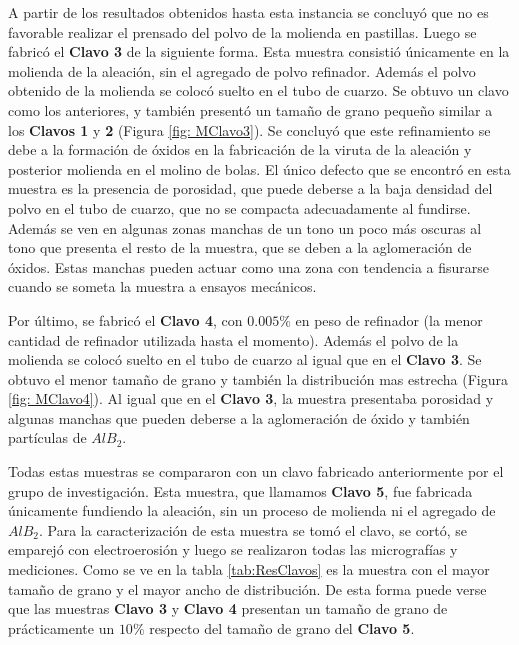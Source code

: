 \documentclass[a4paper,12pt,fleqn,twoside,openany]{book}
\begin{document}
A partir de los resultados obtenidos hasta esta instancia se concluyó que no es favorable realizar el prensado del polvo de la molienda en pastillas. 
Luego se fabricó el \textbf{Clavo 3} de la siguiente forma. Esta muestra consistió únicamente en la molienda de la aleación, sin el agregado de polvo refinador. Además el polvo obtenido de la molienda se colocó suelto en el tubo de cuarzo. Se obtuvo un clavo como los anteriores, y también presentó un tamaño de grano pequeño similar a los \textbf{Clavos 1} y \textbf{2} (Figura \ref{fig: MClavo3}). Se concluyó que este refinamiento se debe a la formación de óxidos en la fabricación de la viruta de la aleación y posterior molienda en el molino de bolas. El único defecto que se encontró en esta muestra es la presencia de porosidad, que puede deberse a la baja densidad del polvo en el tubo de cuarzo, que no se compacta adecuadamente al fundirse. Además se ven en algunas zonas manchas de un tono un poco más oscuras al tono que presenta el resto de la muestra, que se deben a la aglomeración de óxidos. Estas manchas pueden actuar como una zona con tendencia a fisurarse cuando se someta la muestra a ensayos mecánicos. 

Por último, se fabricó el  \textbf{Clavo 4}, con $0.005 \%$ en peso de refinador (la menor cantidad de refinador utilizada hasta el momento). Además el polvo de la molienda se colocó suelto en el tubo de cuarzo al igual que en el \textbf{Clavo 3}. Se obtuvo el menor tamaño de grano y también la distribución mas estrecha (Figura \ref{fig: MClavo4}). Al igual que en el \textbf{Clavo 3}, la muestra presentaba porosidad y algunas manchas que pueden deberse a la aglomeración de óxido y también partículas de $AlB_2$.
 


Todas estas muestras se compararon con un clavo fabricado anteriormente por el grupo de investigación. Esta muestra, que llamamos \textbf{Clavo 5}, fue fabricada únicamente fundiendo la aleación, sin un proceso de molienda ni el agregado de $AlB_2$. Para la caracterización de esta muestra se tomó el clavo, se cortó, se emparejó con electroerosión y luego se realizaron todas las micrografías y mediciones. Como se ve en la tabla \ref{tab:ResClavos} es la muestra con el mayor tamaño de grano y el mayor ancho de distribución. De esta forma puede verse que las muestras \textbf{Clavo 3} y \textbf{Clavo 4} presentan un tamaño de grano de prácticamente un $10 \%$ respecto del tamaño de grano del \textbf{Clavo 5}.   
\end{document}
